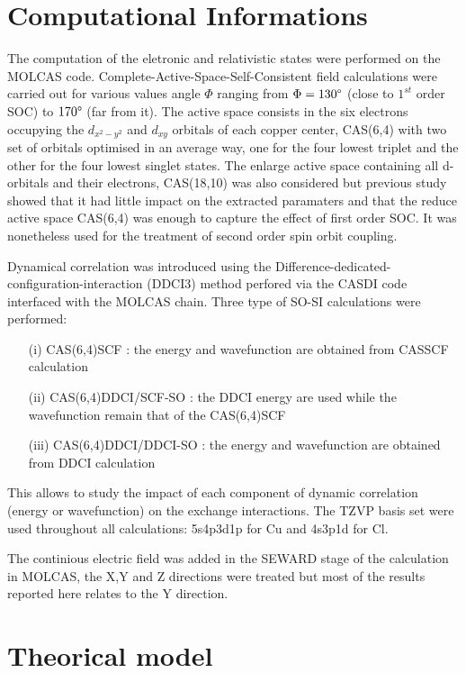 \documentclass[10pt]{report}
\numberwithin{equation}{section}
\begin{document}
\section{Computational Informations}

The computation of the eletronic and relativistic states were performed on the MOLCAS code.
Complete-Active-Space-Self-Consistent field calculations were carried out for various values angle $\Phi$ ranging from $\Phi=130\degree$ (close to $1^{st}$ order SOC) to $170\degree$ (far from it).
The active space consists in the six electrons occupying the $d_{x^2-y^2}$ and $d_{xy}$ orbitals of each copper center, CAS(6,4) with two set of orbitals optimised in an average way, one for the four lowest triplet and the other for the four lowest singlet states.
The enlarge active space containing all d-orbitals and their electrons, CAS(18,10) was also considered but previous study showed that it had little impact on the extracted paramaters and that the reduce active space CAS(6,4) was enough to capture the effect of first order SOC.
It was nonetheless used for the treatment of second order spin orbit coupling.

Dynamical correlation was introduced using the Difference-dedicated-configuration-interaction (DDCI3) method perfored via the CASDI code interfaced with the MOLCAS chain.
Three type of SO-SI calculations were performed:
\begin{itemize}
    \item[(i)] CAS(6,4)SCF : the energy and wavefunction are obtained from CASSCF calculation
    \item[(ii)] CAS(6,4)DDCI/SCF-SO : the DDCI energy are used while the wavefunction remain that of the CAS(6,4)SCF
    \item[(iii)] CAS(6,4)DDCI/DDCI-SO : the energy and wavefunction are obtained from DDCI calculation
\end{itemize}
This allows to study the impact of each component of dynamic correlation (energy or wavefunction) on the exchange interactions.
The TZVP basis set were used throughout all calculations: 5s4p3d1p for Cu and 4s3p1d for Cl.

The continious electric field was added in the SEWARD stage of the calculation in MOLCAS, the X,Y and Z directions were treated but most of the results reported here relates to the Y direction.

\section{Theorical model}
\end{document}
